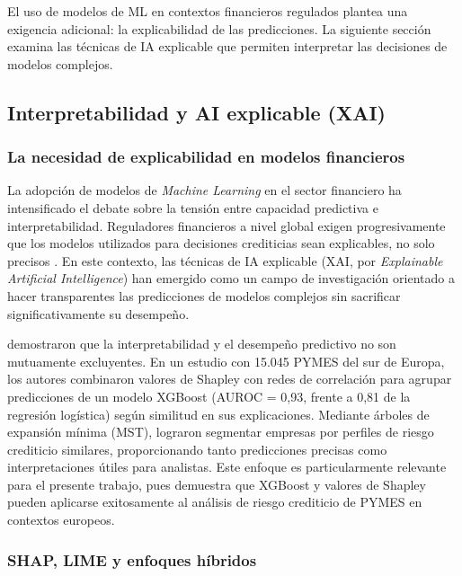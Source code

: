 \documentclass[12pt, letterpaper]{article}
\begin{document}
El uso de modelos de ML en contextos financieros regulados plantea una exigencia adicional: la explicabilidad de las predicciones. La siguiente secci\'on examina las t\'ecnicas de IA explicable que permiten interpretar las decisiones de modelos complejos.

\subsection{Interpretabilidad y AI explicable (XAI)}
\label{sec:xai}

\subsubsection{La necesidad de explicabilidad en modelos financieros}

La adopci\'on de modelos de \textit{Machine Learning} en el sector financiero ha intensificado el debate sobre la tensi\'on entre capacidad predictiva e interpretabilidad. Reguladores financieros a nivel global exigen progresivamente que los modelos utilizados para decisiones crediticias sean explicables, no solo precisos \citep{Bazarbash2019}. En este contexto, las t\'ecnicas de IA explicable (XAI, por \textit{Explainable Artificial Intelligence}) han emergido como un campo de investigaci\'on orientado a hacer transparentes las predicciones de modelos complejos sin sacrificar significativamente su desempe\~no.

\citet{Bussmann2020} demostraron que la interpretabilidad y el desempe\~no predictivo no son mutuamente excluyentes. En un estudio con 15.045 PYMES del sur de Europa, los autores combinaron valores de Shapley con redes de correlaci\'on para agrupar predicciones de un modelo XGBoost (AUROC = 0,93, frente a 0,81 de la regresi\'on log\'istica) seg\'un similitud en sus explicaciones. Mediante \'arboles de expansi\'on m\'inima (MST), lograron segmentar empresas por perfiles de riesgo crediticio similares, proporcionando tanto predicciones precisas como interpretaciones \'utiles para analistas. Este enfoque es particularmente relevante para el presente trabajo, pues demuestra que XGBoost y valores de Shapley pueden aplicarse exitosamente al an\'alisis de riesgo crediticio de PYMES en contextos europeos.

\subsubsection{SHAP, LIME y enfoques h\'ibridos}
\end{document}
